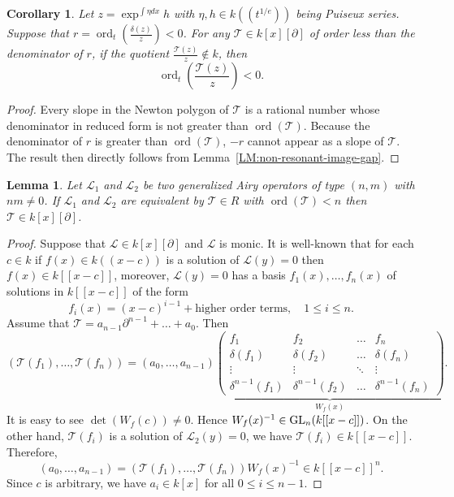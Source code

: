 \documentclass{article}
\newtheorem{lemma}[theorem]{Lemma}
\newtheorem{corollary}[theorem]{Corollary}
\DeclareMathOperator{\ord}{ord}
\newcommand{\dd}{\delta}
\newcommand{\pa}{\partial}
\newcommand{\GL}{{\hbox{\rm GL}}}
\newcommand{\calL}{{\mathcal{L}}}
\newcommand{\calT}{{\mathcal{T}}}
\begin{document}
\begin{corollary}
  \label{COR:non-resonant-image-gap}
  Let $z=\exp^{\int \eta dx}h$ with $\eta,h\in k((t^{1/e}))$ being Puiseux series. 
  Suppose that $r=\ord_t\left(\frac{\dd (z)}{z}\right)<0$. For any $\calT \in k[x][\pa]$ of order less than the denominator of $r$, 
  if the quotient $\frac{\calT(z)}{z} \notin k$, then
  \[ \ord_t\left(\frac{\calT(z)}{z}\right) < 0. \]
\end{corollary}
\begin{proof}
Every slope in the Newton polygon of $\calT$ is a rational number whose denominator in reduced form is not greater than $\ord(\calT)$.
Because the denominator of $r$ is greater than $\ord(\calT)$, 
$-r$ cannot appear as a slope of $\calT$. The result then directly follows from Lemma~\ref{LM:non-resonant-image-gap}.
\end{proof}

\begin{lemma}
  \label{LM:coefficientsoftransformer}
  Let $\calL_1$ and $\calL_2$ be two generalized Airy operators of type $(n,m)$ with $nm\neq 0$. If 
  $\calL_1$ and $\calL_2$ are equivalent by $\calT\in R$ with $\ord(\calT)<n$ then $\calT\in k[x][\pa]$.  
\end{lemma}
\begin{proof}
Suppose that $\calL\in k[x][\pa]$ and $\calL$ is monic. It is well-known that for each $c\in k$ if $f(x)\in k((x-c))$ is a solution of $\calL(y)=0$ 
then $f(x)\in k[[x-c]]$, moreover, $\calL(y)=0$ has a basis $f_1(x),\dots,f_n(x)$ of solutions in $k[[x-c]]$ of the form
$$
    f_i(x)=(x-c)^{i-1} + \text{higher order terms}, \quad 1 \leq i \leq n.
$$
Assume that $\calT=a_{n-1}\pa^{n-1}+\dots+a_0$. Then 
$$
  (\calT(f_1),\dots,\calT(f_n)) =(a_0,\dots,a_{n-1})\underbrace{\begin{pmatrix} f_1 & f_2 & \dots & f_n \\
    \delta(f_1) & \delta(f_2) & \dots & \delta(f_n) \\
    \vdots & \vdots & \ddots & \vdots \\
    \delta^{n-1}(f_1) & \delta^{n-1}(f_2) & \dots & \delta^{n-1}(f_n) 
  \end{pmatrix} }_{W_f(x)}.
$$
It is easy to see $\det(W_f(c))\neq 0$. Hence $W_f(x)^{-1}\in \GL_n(k[[x-c]])$. On the other hand, 
 $\calT(f_i)$ is a solution of $\calL_2(y)=0$, we have $\calT(f_i)\in k[[x-c]]$. Therefore, 
 $$(a_0,\dots,a_{n-1}) = (\calT(f_1),\dots,\calT(f_n)) W_f(x)^{-1} \in k[[x-c]]^n.$$
Since $c$ is arbitrary, we have $a_i\in k[x]$ for all $0\leq i \leq n-1$.
\end{proof}
\end{document}
